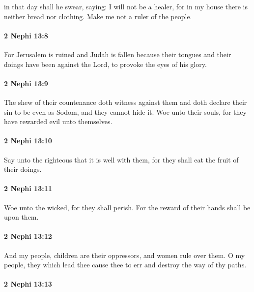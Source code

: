 			in that day shall he swear, saying:
			I will not be a healer,
			for in my house there is neither bread nor clothing.
			Make me not a ruler of the people.

		\paragraph{2 Nephi 13:8} %
			\label{2NEPHI-13-8}

			For Jerusalem is ruined and Judah is fallen
			because their tongues and their doings have been against the Lord,
			to provoke the eyes of his glory.

		\paragraph{2 Nephi 13:9} %
			\label{2NEPHI-13-9}

			The shew of their countenance doth witness against them
			and doth declare their sin to be even as Sodom,
			and they cannot hide it.
			Woe unto their souls, for they have rewarded evil unto themselves.

		\paragraph{2 Nephi 13:10} %
			\label{2NEPHI-13-10}

			Say unto the righteous that it is well with them,
			for they shall eat the fruit of their doings.

		\paragraph{2 Nephi 13:11} %
			\label{2NEPHI-13-11}

			Woe unto the wicked, for they shall perish.
			For the reward of their hands shall be upon them.

		\paragraph{2 Nephi 13:12} %
			\label{2NEPHI-13-12}

			And my people, children are their oppressors,
			and women rule over them.
			O my people, they which lead thee cause thee to err
			and destroy the way of thy paths.

		\paragraph{2 Nephi 13:13} %
			\label{2NEPHI-13-13}

